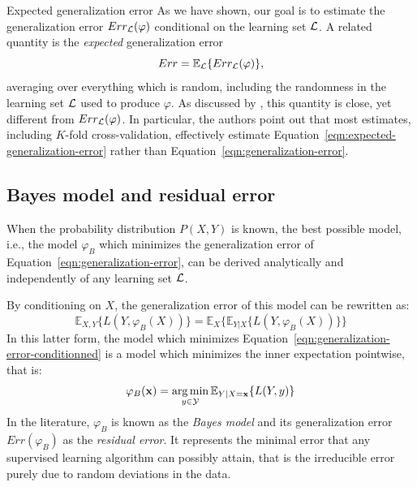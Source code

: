 \begin{remark}{Expected generalization error}
As we have shown, our goal is to estimate the generalization error $Err_{\cal
L}(\varphi)$ conditional on the learning set ${\cal L}$. A related quantity
is the \textit{expected} generalization error
\begin{equation}\label{eqn:expected-generalization-error}
Err = \mathbb{E}_{\cal L} \{ Err_{\cal L}(\varphi) \},
\end{equation}
averaging over everything which is random, including the randomness in the
learning set ${\cal L}$ used to produce $\varphi$. As discussed by
\citet{hastie:2005}, this quantity is close, yet different from $Err_{\cal
L}(\varphi)$. In particular, the authors point out that most estimates, including $K$-fold
cross-validation, effectively estimate
Equation~\ref{eqn:expected-generalization-error} rather than
Equation~\ref{eqn:generalization-error}.
\end{remark}

\subsection{Bayes model and residual error}
\label{sec:bayes-model}

When the probability distribution $P(X, Y)$ is known, the best possible model,
i.e., the model $\varphi_B$ which minimizes the generalization error of
Equation~\ref{eqn:generalization-error}, can be derived analytically and
independently of any learning set ${\cal L}$.

By conditioning on $X$, the generalization error of this model can be rewritten as:
\begin{equation}\label{eqn:generalization-error-conditionned}
\mathbb{E}_{X, Y}\{ L(Y, \varphi_B(X)) \} = \mathbb{E}_{X}\{ \mathbb{E}_{Y|X} \{ L(Y, \varphi_B(X)) \} \}
\end{equation}
In this latter form, the model which minimizes
Equation~\ref{eqn:generalization-error-conditionned} is a model which
minimizes the inner expectation pointwise, that is:
\begin{equation}
\varphi_B(\mathbf{x}) = \operatorname*{arg\,min}_{y \in {\cal Y}} \mathbb{E}_{Y|X=\mathbf{x}} \{ L(Y, y) \}
\end{equation}
In the literature, $\varphi_B$ is known as the \textit{Bayes model} and its
generalization error $Err(\varphi_B)$ as the \textit{residual error}. It represents the minimal
error that any supervised learning algorithm can possibly attain, that is
the irreducible error purely due to random deviations in the data.

